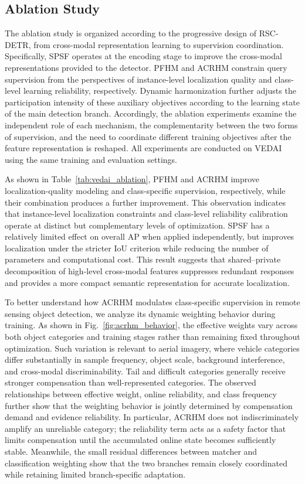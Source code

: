 \documentclass[letterpaper,journal]{IEEEtran}
\begin{document}
\subsection{Ablation Study}
The ablation study is organized according to the progressive design of RSC-DETR, from cross-modal representation learning to supervision coordination. Specifically, SPSF operates at the encoding stage to improve the cross-modal representations provided to the detector. PFHM and ACRHM constrain query supervision from the perspectives of instance-level localization quality and class-level learning reliability, respectively. Dynamic harmonization further adjusts the participation intensity of these auxiliary objectives according to the learning state of the main detection branch. Accordingly, the ablation experiments examine the independent role of each mechanism, the complementarity between the two forms of supervision, and the need to coordinate different training objectives after the feature representation is reshaped. All experiments are conducted on VEDAI using the same training and evaluation settings.

As shown in Table~\ref{tab:vedai_ablation}, PFHM and ACRHM improve localization-quality modeling and class-specific supervision, respectively, while their combination produces a further improvement. This observation indicates that instance-level localization constraints and class-level reliability calibration operate at distinct but complementary levels of optimization. SPSF has a relatively limited effect on overall AP when applied independently, but improves localization under the stricter IoU criterion while reducing the number of parameters and computational cost. This result suggests that shared--private decomposition of high-level cross-modal features suppresses redundant responses and provides a more compact semantic representation for accurate localization.

To better understand how ACRHM modulates class-specific supervision in
remote sensing object detection, we analyze its dynamic weighting behavior
during training. As shown in Fig.~\ref{fig:acrhm_behavior}, the effective
weights vary across both object categories and training stages rather than
remaining fixed throughout optimization. Such variation is relevant to
aerial imagery, where vehicle categories differ substantially in sample
frequency, object scale, background interference, and cross-modal
discriminability. Tail and difficult categories generally receive stronger
compensation than well-represented categories. The observed relationships
between effective weight, online reliability, and class frequency further
show that the weighting behavior is jointly determined by compensation
demand and evidence reliability. In particular, ACRHM does not
indiscriminately amplify an unreliable category; the reliability term acts
as a safety factor that limits compensation until the accumulated online
state becomes sufficiently stable. Meanwhile, the small residual differences
between matcher and classification weighting show that the two branches
remain closely coordinated while retaining limited branch-specific
adaptation.
\end{document}
